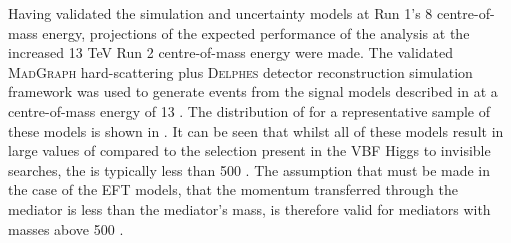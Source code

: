 Having validated the simulation and uncertainty models at Run 1's 8 \TeV centre-of-mass energy, projections of the expected performance of the analysis at the increased 13 TeV Run 2 centre-of-mass energy were made. The validated \textsc{MadGraph} hard-scattering plus \textsc{Delphes} detector reconstruction simulation framework was used to generate events from the signal models described in  at a centre-of-mass energy of 13 \TeV. The distribution of \MET for a representative sample of these models is shown in . It can be seen that whilst all of these models result in large values of \MET compared to the selection present in the \ac{VBF} Higgs to invisible searches, the \MET is typically less than 500 \GeV. The assumption that must be made in the case of the \ac{EFT} models, that the momentum transferred through the mediator is less than the mediator's mass, is therefore valid for mediators with masses above 500 \GeV.

